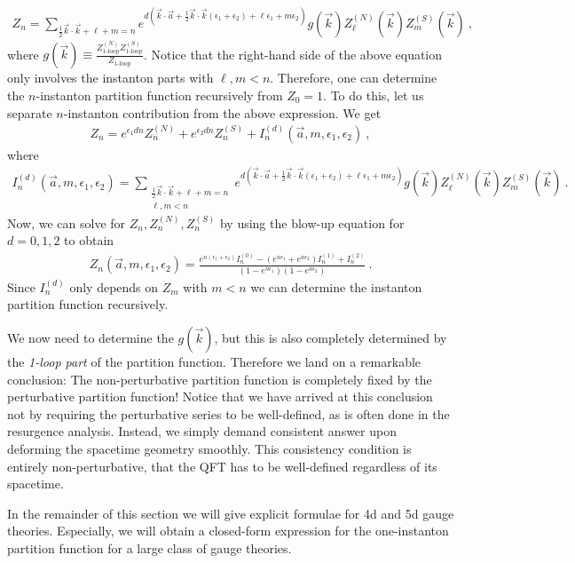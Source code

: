 \documentclass[letterpaper, 11pt]{article}
\def\e{\epsilon}
\def\half{\frac{1}{2}}
\begin{document}
\begin{align}
 Z_n = \sum_{\half \vec{k}\cdot\vec{k} + \ell + m = n} e^{d\left( \vec{k} \cdot \vec{a} + \half \vec{k} \cdot \vec{k} (\e_1 + \e_2) + \ell \e_1 + m \e_2 \right)} g(\vec{k}) Z^{(N)}_{\ell}(\vec{k}) Z^{(S)}_m (\vec{k}) \ , 
\end{align}
where $g(\vec{k}) \equiv \frac{Z^{(N)}_{\textrm{1-loop}} Z^{(S)}_{\textrm{1-loop}}}{Z_{\textrm{1-loop}}}$. Notice that the right-hand side of the above equation only involves the instanton parts with $\ell , m < n$. Therefore, one can determine the $n$-instanton partition function recursively from $Z_0 = 1$. 
To do this, let us separate $n$-instanton contribution from the above expression. We get 
\begin{align}
 Z_n = e^{\e_1 d n} Z^{(N)}_n + e^{\e_2 d n} Z^{(S)}_n + I_n^{(d)}(\vec{a}, m, \e_1, \e_2) \ , 
\end{align}
where
\begin{align}
I_n^{(d)}(\vec{a}, m, \e_1, \e_2) = \sum_{\substack{\half \vec{k}\cdot\vec{k} + \ell + m = n \\ \ell, m < n}} e^{d\left( \vec{k} \cdot \vec{a} + \half \vec{k} \cdot \vec{k} (\e_1 + \e_2) + \ell \e_1 + m \e_2 \right)} g(\vec{k}) Z^{(N)}_{\ell}(\vec{k}) Z^{(S)}_m (\vec{k}) \ . 
\end{align}
Now, we can solve for $Z_n, Z_n^{(N)}, Z_n^{(S)}$ by using the blow-up equation for $d=0, 1, 2$ to obtain
\begin{align}
 Z_n (\vec{a}, m, \e_1, \e_2) = \frac{e^{n(\e_1 + \e_2)} I_n^{(0)} - (e^{n\e_1} + e^{n \e_2}) I_n^{(1)} + I_n^{(2)} }{(1-e^{n\e_1})(1-e^{n\e_2})} \ . 
\end{align}
Since $I_n^{(d)}$ only depends on $Z_m$ with $m<n$ we can determine the instanton partition function recursively. 

We now need to determine the $g(\vec{k})$, but this is also completely determined by the \emph{1-loop part} of the partition function. Therefore we land on a remarkable conclusion: The non-perturbative partition function is completely fixed by the perturbative partition function! Notice that we have arrived at this conclusion not by requiring the perturbative series to be well-defined, as is often done in the resurgence analysis. Instead, we simply demand consistent answer upon deforming the spacetime geometry smoothly. This consistency condition is entirely non-perturbative, that the QFT has to be well-defined regardless of its spacetime. 

In the remainder of this section we will give explicit formulae for 4d and 5d gauge theories. Especially, we will obtain a closed-form expression for the one-instanton partition function for a large class of gauge theories. 
\end{document}
